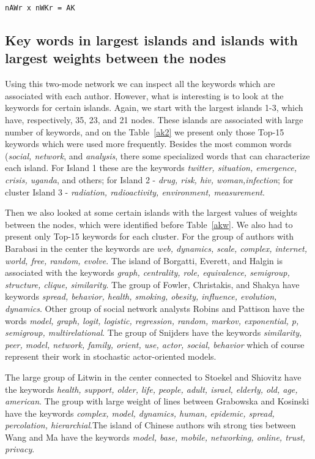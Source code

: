 \documentclass[11pt]{article} %
\begin{document}
\texttt{nAWr x nWKr = AK}

\subsection{Key words in largest islands and islands with largest weights between the nodes}  

Using this two-mode network we can inspect all the keywords which are associated with each author. However, what is interesting is to look at the keywords for certain islands. Again, we start with the largest islands 1-3, which have, respectively, 35, 23, and 21 nodes. These islands are associated with large number of keywords, and on the Table~\ref{ak2} we present only those Top-15 keywords which were used more frequently. Besides the most common words (\textit{social, network}, and \textit{analysis}, there some specialized words that can characterize each island. For  Island 1 these are the keywords \textit{twitter, situation, emergence, crisis, uganda}, and others; for Island 2 - \textit{drug, risk, hiv, woman,infection}; for cluster Island 3 - \textit{radiation, radioactivity, environment, measurement}.  \medskip

Then we also looked at some certain islands with the largest values of weights between the nodes, which were identified before Table~\ref{akw}. We also had to present only Top-15 keywords for each cluster. For the group of authors with Barabasi in the center the keywords are \textit{web, dynamics, scale, complex, internet, world, free, random, evolve}. The island of Borgatti,  Everett, and Halgin is associated with the keywords \textit{graph, centrality, role, equivalence, semigroup, structure, clique, similarity}. The group of Fowler, Christakis, and Shakya have keywords \textit{spread, behavior, health, smoking, obesity, influence, evolution, dynamics}. Other group of social network analysts Robins and Pattison have the words \textit{model, graph, logit, logistic, regression, random, markov, exponential, p, semigroup, multirelational}. The group of Snijders have the keywords \textit{similarity, peer, model, network, family, orient, use, actor, social, behavior} which of course represent their work in stochastic actor-oriented models. \medskip

The large group of Litwin in the center connected to Stoekel and Shiovitz have the keywords \textit{health, support, older, life, people, adult, israel, elderly, old, age, american}. The group with large weight of lines between Grabowska and Kosinski have the keywords \textit{complex, model, dynamics, human, epidemic, spread, percolation, hierarchial}.The island of  Chinese authors wih strong ties between Wang and Ma have the keywords \textit{model, base, mobile, networking, online, trust, privacy}. \medskip
\end{document}
